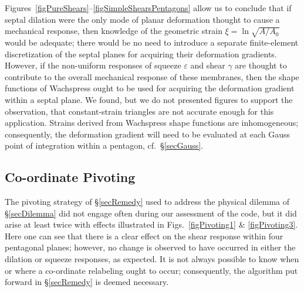 Figures~\ref{figPureShears}--\ref{figSimpleShearsPentagons} allow us to conclude that if septal dilation were the only mode of planar deformation thought to cause a mechanical response, then knowledge of the geometric strain $\xi = \ln \sqrt{A/A_0}$ would be adequate; there would be no need to introduce a separate finite-element discretization of the septal planes for acquiring their deformation gradients.  However, if the non-uniform responses of squeeze $\varepsilon$ and shear $\gamma$ are thought to contribute to the overall mechanical response of these membranes, then the shape functions of Wachspress \cite{Wachspress75,Wachspress16} ought to be used for acquiring the deformation gradient within a septal plane.  We found, but we do not presented figures to support the observation, that constant-strain triangles are not accurate enough for this application.  Strains derived from Wachspress shape functions are inhomogeneous; consequently, the deformation gradient will need to be evaluated at each Gauss point of integration within a pentagon, cf.\ \S\ref{secGauss}.

\subsection{Co-ordinate Pivoting}

The pivoting strategy of \S\ref{secRemedy} used to address the physical dilemma of \S\ref{secDilemma} did not engage often during our assessment of the code, but it did arise at least twice with effects illustrated in Figs.~\ref{figPivoting1} \& \ref{figPivoting3}.  Here one can see that there is a clear effect on the shear response within four pentagonal planes; however, no change is observed to have occurred in either the dilation or squeeze responses, as expected.  It is not always possible to know when or where a co-ordinate relabeling ought to occur; consequently, the algorithm put forward in \S\ref{secRemedy} is deemed necessary.

